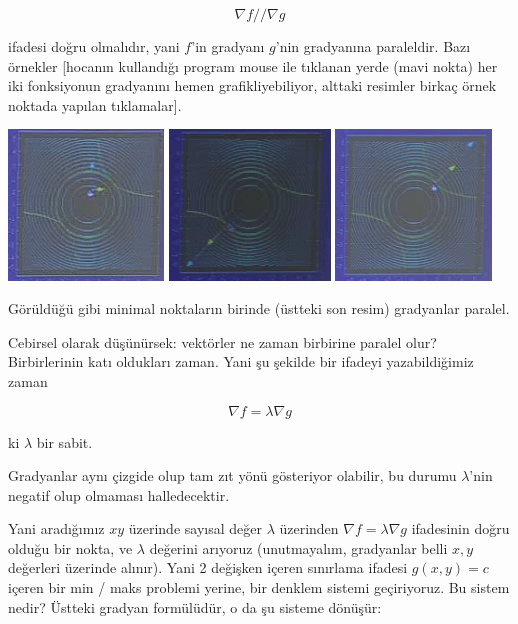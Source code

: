 \documentclass[12pt,fleqn]{article}\usepackage{../../common}
\begin{document}
$$ \nabla f // \nabla g $$

ifadesi doğru olmalıdır, yani $f$'in gradyanı $g$'nin gradyanına
paraleldir. Bazı örnekler [hocanın kullandığı program mouse ile tıklanan
yerde (mavi nokta) her iki fonksiyonun gradyanını hemen grafikliyebiliyor,
alttaki resimler birkaç örnek noktada yapılan tıklamalar]. 
\begin{center}
\includegraphics[height=4cm]{13_4.png}
\includegraphics[height=4cm]{13_6.png}
\includegraphics[height=4cm]{13_5.png}
\end{center}
Görüldüğü gibi minimal noktaların birinde (üstteki son resim) gradyanlar
paralel. 

Cebirsel olarak düşünürsek: vektörler ne zaman birbirine paralel olur?
Birbirlerinin katı oldukları zaman. Yani şu şekilde bir ifadeyi
yazabildiğimiz zaman

$$ \nabla f = \lambda \nabla g $$

ki $\lambda$ bir sabit. 

Gradyanlar aynı çizgide olup tam zıt yönü gösteriyor olabilir, bu durumu
$\lambda$'nin negatif olup olmaması halledecektir.

Yani aradığımız $xy$ üzerinde sayısal değer $\lambda$ üzerinden $\nabla f =
\lambda \nabla g $ ifadesinin doğru olduğu bir nokta, ve $\lambda$ değerini
arıyoruz (unutmayalım, gradyanlar belli $x,y$ değerleri üzerinde alınır). Yani 2
değişken içeren sınırlama ifadesi $g(x,y)=c$ içeren bir min / maks problemi
yerine, bir denklem sistemi geçiriyoruz. Bu sistem nedir?  Üstteki gradyan
formülüdür, o da şu sisteme dönüşür:
\end{document}
